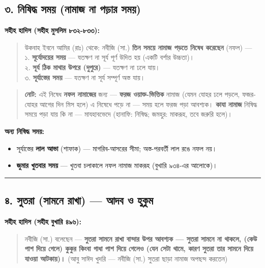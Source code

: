 \subsection*{৩. নিষিদ্ধ সময় (নামাজ না পড়ার সময়)}

\textbf{সহীহ হাদিস (সহীহ মুসলিম ৮৩২-৮৩৩):}

\begin{quote}
উকবাহ ইবনে আমির (রাঃ) থেকে: নবীজি (সা.) \textbf{তিন সময়ে নামাজ পড়তে নিষেধ করেছেন} (নফল) — \\
১. \textbf{সূর্যোদয়ের সময়} — যতক্ষণ না সূর্য পূর্ণ উদিত হয় (একটি বর্শার উচ্চতা)। \\
২. \textbf{সূর্য ঠিক মাথার উপরে (দুপুরে)} — যতক্ষণ না ঢলে যায়। \\
৩. \textbf{সূর্যাস্তের সময়} — যতক্ষণ না সূর্য সম্পূর্ণ অস্ত যায়।
\end{quote}

\begin{quote}
\textbf{নোট:} এই নিষেধ \textbf{নফল নামাজের} জন্য — \textbf{ফরজ ওয়াক্ত-ভিত্তিক} নামাজ (যেমন যোহর ঢলে পড়লে, ফজর-যোহর আগের দিন মিস হলে) এ নিষেধে পড়ে না — সময় হলে ফরজ পড়া আবশ্যক। \textbf{কাযা নামাজ} নিষিদ্ধ সময়ে পড়া যায় কি না — মাযহাবভেদে (হানাফি: নিষিদ্ধ; জমহুর: মাকরূহ, তবে জরুরি হলে)।
\end{quote}

\textbf{অন্য নিষিদ্ধ সময়:}
\begin{itemize}
\item সূর্যাস্তের \textbf{লাল আভা} (শাফাক) — মাগরিব-আসরের সীমা; অস্ত-পরবর্তী লাল রঙে নফল নয়।
\item \textbf{জুমার খুতবার সময়} — খুতবা চলাকালে নফল নামাজ মাকরূহ (বুখারি ৯৩৪-এর আলোকে)।
\end{itemize}
\medskip\hrule\medskip

\subsection*{৪. সুতরা (সামনে রাখা) — আদব ও হুকুম}

\textbf{সহীহ হাদিস (সহীহ বুখারি ৪৯৬):}

\begin{quote}
নবীজি (সা.) বলেছেন — \textbf{সুতরা সামনে রাখা বান্দার উপর আবশ্যক — সুতরা সামনে না থাকলে, (কেউ পাশ দিয়ে গেলে) কুকুর কিংবা গাধা পাশ দিয়ে গেলেও (যেন সেটা থামে, কারণ সুতরা তার সামনে দিয়ে যাওয়া আটকায়)।} (আবু সাঈদ খুদরি — নবীজি (সা.) সুতরা ছাড়া নামাজ অপছন্দ করতেন)
\end{quote}

